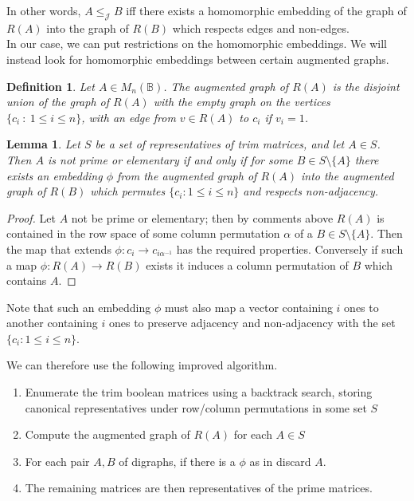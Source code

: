 \documentclass[11pt]{article}
\newtheorem{lemma}[thm]{Lemma}
\newtheorem{defi}[thm]{Definition}
\numberwithin{equation}{section}
\renewcommand{\to}{\longrightarrow}
\newcommand{\B}{\mathbb{B}}
\newcommand{\Bn}{M_n(\B)}
\newcommand{\J}{\mathscr{J}}
\begin{document}
In other words, $A \leq_{\J} B$ iff there exists a homomorphic embedding of the 
graph of $R(A)$ into the graph of $R(B)$ which respects edges and non-edges. \\

In our case, we can put restrictions on the homomorphic embeddings. We will instead
look for homomorphic embeddings between certain augmented graphs.

\begin{defi}
  Let $A \in \Bn$. The \emph{augmented graph of $R(A)$} is the disjoint union of
  the graph of $R(A)$ with the empty graph on the vertices $\{c_i \: : \: 1 \leq
    i \leq n\}$, with an edge from $v \in R(A)$ to $c_i$ if $v_i = 1$.
\end{defi}

\begin{lemma}
  Let $S$ be a set of representatives of trim matrices, and let $A \in S$. Then
  $A$ is not prime or elementary if and only if for some $B \in S\setminus
  \{A\}$ there exists an embedding $\phi$ from the augmented graph of $R(A)$
  into the augmented graph of $R(B)$ which permutes $\{ c_i : 1 \leq i \leq n
  \}$ and respects non-adjacency.
\end{lemma}
\begin{proof}
  Let $A$ not be prime or elementary; then by comments above $R(A)$ is contained
  in the row space of some column permutation $\alpha$ of a $B \in S \setminus
  \{A\}$. Then the map that extends $\phi : c_i \to c_{i\alpha^{-1}}$ has the
  required properties. Conversely if such a map $\phi : R(A) \to R(B)$ exists it
  induces a column permutation of $B$ which contains $A$. 
\end{proof}

Note that such an embedding $\phi$ must also map a vector containing $i$ ones to
another containing $i$ ones to preserve adjacency and non-adjacency with the set
$\{ c_i : 1 \leq i \leq n \}$.

We can therefore use the following improved algorithm.
\begin{enumerate}
  \item
    Enumerate the trim boolean matrices using a backtrack search, storing 
    canonical representatives under row/column permutations in some set $S$
  \item 
    Compute the augmented graph of $R(A)$ for each $A \in S$
  \item 
    For each pair $A, B$ of digraphs, if there is a $\phi$ as in
     discard $A$.
  \item
    The remaining matrices are then representatives of the prime matrices.
\end{enumerate}
\end{document}

